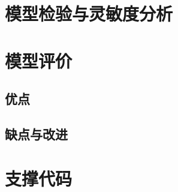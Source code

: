 \documentclass[12pt]{article}
\begin{document}
\section{模型检验与灵敏度分析}

\section{模型评价}
\subsection{优点}
\subsection{缺点与改进}



\appendix
\section{支撑代码}
% 
\end{document}

